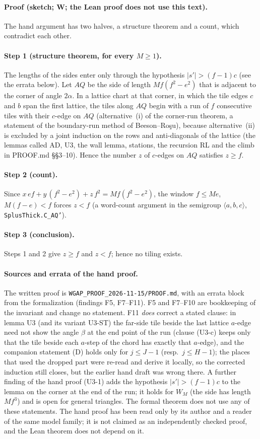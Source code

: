 \documentclass[11pt,reqno]{amsart}
\theoremstyle{plain}
\theoremstyle{definition}
\newcommand{\sW}{\textup{\textsf{W}}}
\newcommand{\rec}[1]{\textup{\texttt{#1}}}
\begin{document}
\paragraph{Proof (sketch; \sW; the Lean proof does not use this text).}
The hand argument has two halves, a structure theorem and a count, which contradict each other.
\paragraph{Step 1 (structure theorem, for every $M\ge1$).}
The lengths of the sides enter only through the hypothesis $|s'|>(f-1)c$ (see the errata below). Let $AQ$ be the side of length $Mf(f^2-e^2)$ that is
adjacent to the corner of angle $2\alpha$. In a lattice chart at that corner, in which the tile edges $c$ and $b$
span the first lattice, the tiles along $AQ$ begin with a run of $f$ consecutive tiles with their $c$-edge on
$AQ$ (alternative~(i) of the corner-run theorem, a statement of the boundary-run method of Beeson--Ro\c{s}u),
because alternative~(ii) is excluded by a joint induction on the rows and anti-diagonals of the lattice (the
lemmas called AD, U3, the wall lemma, stations, the recursion RL and the climb in PROOF.md \S\S3--10). Hence the
number $z$ of $c$-edges on $AQ$ satisfies $z\ge f$.
\paragraph{Step 2 (count).} Since
$x\,ef+y\,(f^2-e^2)+z\,f^2=Mf(f^2-e^2)$, the window $f\le Me$, $M(f-e)<f$ forces $z<f$ (a word-count argument in
the semigroup $\langle a,b,c\rangle$, \rec{SplusThick.C\_AQ'}).
\paragraph{Step 3 (conclusion).} Steps 1 and 2 give $z\ge f$ and $z<f$; hence no tiling exists.
\paragraph{Sources and errata of the hand proof.}
The written proof is \rec{WGAP\_PROOF\_2026-11-15/PROOF.md}, with an errata block from the formalization
(findings F5, F7--F11). F5 and F7--F10 are bookkeeping of the invariant and change no statement. F11 \emph{does}
correct a stated clause: in lemma U3 (and its variant U3-ST) the far-side tile beside the last lattice $a$-edge
need not show the angle $\beta$ at the end point of the run (clause (U3-c) keeps only that the tile beside each
$a$-step of the chord has exactly that $a$-edge), and the companion statement (D) holds only for $j\le J-1$
(resp.\ $j\le H-1$); the places that used the dropped part were re-read and derive it locally, so the corrected
induction still closes, but the earlier hand draft was wrong there. A further finding of the hand proof (U3-1) adds
the hypothesis $|s'|>(f-1)c$ to the lemma on the corner at the end of the run; it holds for $W_M$ (the side has
length $Mf^3$) and is open for general triangles. The formal theorem does not use any of these statements.
The hand proof has been read only by its author and a reader of the same model family; it is not claimed as an
independently checked proof, and the Lean theorem does not depend on it.
\end{document}
